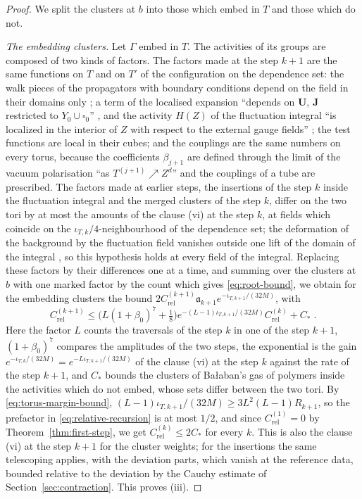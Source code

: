 \documentclass[11pt]{preprint}
\numberwithin{equation}{section}
\theoremstyle{definition}
\theoremstyle{remark}
\theoremstyle{plain}
\begin{document}
\begin{proof}
We split the clusters at $b$ into those which embed in $T$ and those which do not.

\emph{The embedding clusters.} Let $\Gamma$ embed in $T$. The activities of its groups are composed of two kinds of factors. The factors made at the step $k + 1$ are the same functions on $T$ and on $T'$ of the configuration on the dependence set: the walk pieces of the propagators with boundary conditions depend on the field in their domains only \cite[p.~394; Theorem~3.10, p.~416]{BalabanPBG}; a term of the localised expansion ``depends on $\mathbf U$, $\mathbf J$ restricted to $Y_0 \cup \square_0$'' \cite[p.~5]{BalabanRG2}, and the activity $H(Z)$ of the fluctuation integral ``is localized in the interior of $Z$ with respect to the external gauge fields'' \cite[p.~14]{BalabanRG2}; the test functions are local in their cubes; and the couplings are the same numbers on every torus, because the coefficients $\beta_{j+1}$ are defined through the limit of the vacuum polarisation ``as $T^{(j+1)} \nearrow Z^d$'' \cite[p.~264]{BalabanRG1} and the couplings of a tube are prescribed. The factors made at earlier steps, the insertions of the step $k$ inside the fluctuation integral and the merged clusters of the step $k$, differ on the two tori by at most the amounts of the clause (vi) at the step $k$, at fields which coincide on the $\iota_{T,k}/4$-neighbourhood of the dependence set; the deformation of the background by the fluctuation field vanishes outside one lift of the domain of the integral \cite[p.~4]{BalabanRG2}, so this hypothesis holds at every field of the integral. Replacing these factors by their differences one at a time, and summing over the clusters at $b$ with one marked factor by the count which gives \eqref{eq:root-bound}, we obtain for the embedding clusters the bound $2C^{(k+1)}_{\mathrm{rel}}\mathfrak a_{k+1}e^{-\iota_{T,k+1}/(32M)}$, with
\begin{equation}\label{eq:relative-recursion}
    C^{(k+1)}_{\mathrm{rel}} \leq \bigl(L(1 + \beta_0)^7 + \tfrac18\bigr)e^{-(L-1)\iota_{T,k+1}/(32M)}C^{(k)}_{\mathrm{rel}} + C_*\;.
\end{equation}
Here the factor $L$ counts the traversals of the step $k$ in one of the step $k + 1$, $(1 + \beta_0)^7$ compares the amplitudes of the two steps, the exponential is the gain $e^{-\iota_{T,k}/(32M)} = e^{-L\iota_{T,k+1}/(32M)}$ of the clause (vi) at the step $k$ against the rate of the step $k + 1$, and $C_*$ bounds the clusters of Ba{\l}aban's gas of polymers inside the activities which do not embed, whose sets differ between the two tori. By \eqref{eq:torus-margin-bound}, $(L - 1)\iota_{T,k+1}/(32M) \geq 3L^2(L - 1)R_{k+1}$, so the prefactor in \eqref{eq:relative-recursion} is at most $1/2$, and since $C^{(1)}_{\mathrm{rel}} = 0$ by Theorem~\ref{thm:first-step}, we get $C^{(k)}_{\mathrm{rel}} \leq 2C_*$ for every $k$. This is also the clause (vi) at the step $k + 1$ for the cluster weights; for the insertions the same telescoping applies, with the deviation parts, which vanish at the reference data, bounded relative to the deviation by the Cauchy estimate of Section~\ref{sec:contraction}. This proves (iii).


\end{proof}
\end{document}
